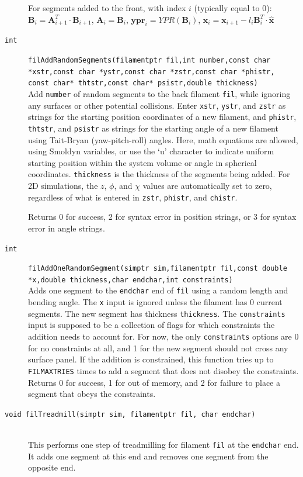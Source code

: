 \documentclass {scrbook}
\newcommand {\ttt} {\texttt}
\begin{document}
\begin{description}
For segments added to the front, with index $i$ (typically equal to 0):
$\bm{B}_i = \bm{A}_{i+1}^T \cdot \bm{B}_{i+1}$, 
$\bm{A}_i = \bm{B}_i$,
$\bm{ypr}_i = YPR(\bm{B}_i)$, 
$\bm{x}_i = \bm{x}_{i+1} - l_i \bm{B}^T_i \cdot \bm{\hat{x}}$

\item[\ttt{int}]
\ttt{filAddRandomSegments(filamentptr fil,int number,const char *xstr,const char *ystr,const char *zstr,const char *phistr, const char* thtstr,const char* psistr,double thickness)}
\hfill \\
Add \ttt{number} of random segments to the back filament \ttt{fil}, while ignoring any surfaces or other potential collisions. Enter \ttt{xstr}, \ttt{ystr}, and \ttt{zstr} as strings for the starting position coordinates of a new filament, and \ttt{phistr}, \ttt{thtstr}, and \ttt{psistr} as strings for the starting angle of a new filament using Tait-Bryan (yaw-pitch-roll) angles. Here, math equations are allowed, using Smoldyn variables, or use the `u' character to indicate uniform starting position within the system volume or angle in spherical coordinates. \ttt{thickness} is the thickness of the segments being added. For 2D simulations, the $z$, $\phi$, and $\chi$ values are automatically set to zero, regardless of what is entered in \ttt{zstr}, \ttt{phistr}, and \ttt{chistr}.

Returns 0 for success, 2 for syntax error in position strings, or 3 for syntax error in angle strings.

\item[\ttt{int}]
\ttt{filAddOneRandomSegment(simptr sim,filamentptr fil,const double *x,double thickness,char endchar,int constraints)}
\hfill \\
Adds one segment to the \ttt{endchar} end of \ttt{fil} using a random length and bending angle. The \ttt{x} input is ignored unless the filament has 0 current segments. The new segment has thickness \ttt{thickness}. The \ttt{constraints} input is supposed to be a collection of flags for which constraints the addition needs to account for. For now, the only \ttt{constraints} options are 0 for no constraints at all, and 1 for the new segment should not cross any surface panel. If the addition is constrained, this function tries up to \ttt{FILMAXTRIES} times to add a segment that does not disobey the constraints. Returns 0 for success, 1 for out of memory, and 2 for failure to place a segment that obeys the constraints.

\item[\ttt{void filTreadmill(simptr sim, filamentptr fil, char endchar)}]
\hfill \\
This performs one step of treadmilling for filament \ttt{fil} at the \ttt{endchar} end. It adds one segment at this end and removes one segment from the opposite end.


\end{description}
\end{document}

